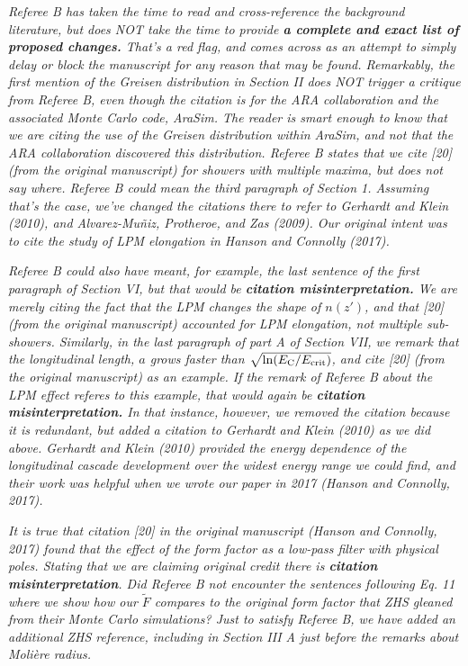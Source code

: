 \documentclass[12pt]{article}
\begin{document}
\textit{Referee B has taken the time to read and cross-reference the background literature, but does NOT take the time to provide \textbf{a complete and exact list of proposed changes.}  That's a red flag, and comes across as an attempt to simply delay or block the manuscript for any reason that may be found.  Remarkably, the first mention of the Greisen distribution in Section II does NOT trigger a critique from Referee B, even though the citation is for the ARA collaboration and the associated Monte Carlo code, AraSim.  The reader is smart enough to know that we are citing the use of the Greisen distribution within AraSim, and not that the ARA collaboration discovered this distribution.  Referee B states that we cite [20] (from the original manuscript) for showers with multiple maxima, but does not say where.  Referee B could mean the third paragraph of Section 1.  Assuming that's the case, we've changed the citations there to refer to Gerhardt and Klein (2010), and Alvarez-Mu\~{n}iz, Protheroe, and Zas (2009).  Our original intent was to cite the study of LPM elongation in Hanson and Connolly (2017).}

\textit{Referee B could also have meant, for example, the last sentence of the first paragraph of Section VI, but that would be \textbf{citation misinterpretation.}  We are merely citing the fact that the LPM changes the shape of $n(z')$, and that [20] (from the original manuscript) accounted for LPM elongation, not multiple sub-showers.  Similarly, in the last paragraph of part A of Section VII, we remark that the longitudinal length, $a$ grows faster than $\sqrt{\ln(E_{\rm C}/E_{\rm crit})}$, and cite [20] (from the original manuscript) as an example.  If the remark of Referee B about the LPM effect referes to this example, that would again be \textbf{citation misinterpretation.}  In that instance, however, we removed the citation because it is redundant, but added a citation to Gerhardt and Klein (2010) as we did above.  Gerhardt and Klein (2010) provided the energy dependence of the longitudinal cascade development over the widest energy range we could find, and their work was helpful when we wrote our paper in 2017 (Hanson and Connolly, 2017).}

\textit{It is true that citation [20] in the original manuscript (Hanson and Connolly, 2017) found that the effect of the form factor as a low-pass filter with physical poles.  Stating that we are claiming original credit there is \textbf{citation misinterpretation}.  Did Referee B not encounter the sentences following Eq. 11 where we show how our $\widetilde{F}$ compares to the original form factor that ZHS gleaned from their Monte Carlo simulations?  Just to satisfy Referee B, we have added an additional ZHS reference, including in Section III A just before the remarks about Moli\`{e}re radius.}
\end{document}
